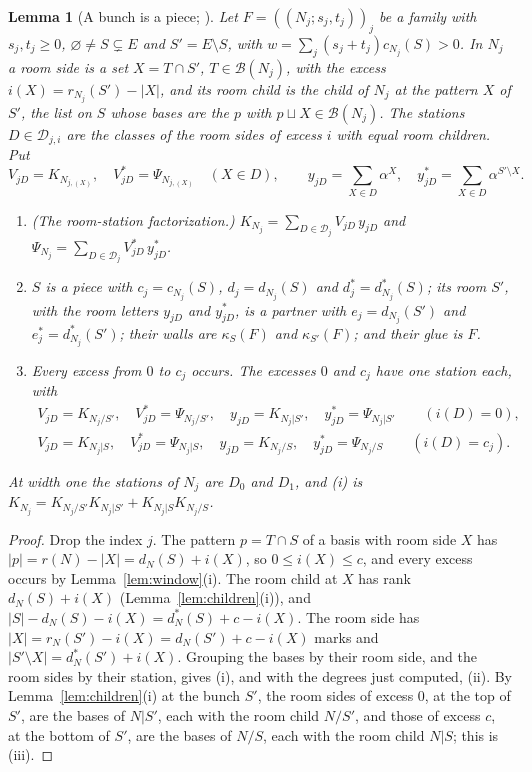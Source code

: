 \documentclass[11pt]{article}
\theoremstyle{plain}
\newtheorem{lemma}[prop]{Lemma}
\theoremstyle{definition}
\theoremstyle{remark}
\newcommand{\cB}{\mathcal B}
\newcommand{\cD}{\mathcal D}
\begin{document}
\begin{lemma}[A bunch is a piece; {\cite[Def.~27.1, p.~224; Props.~27.2, 27.3, pp.~225--226]{F}}]\label{lem:bunchpiece}
Let $F=((N_j;s_j,t_j))_j$ be a family with $s_j,t_j\ge0$, $\varnothing\neq S\subsetneq E$ and $S'=E\setminus S$, with $w=\sum_j(s_j+t_j)c_{N_j}(S)>0$. In $N_j$ a \emph{room side} is a set $X=T\cap S'$, $T\in\cB(N_j)$, with the excess $i(X)=r_{N_j}(S')-|X|$, and its \emph{room child} is the child of $N_j$ at the pattern $X$ of $S'$, the list on $S$ whose bases are the $p$ with $p\sqcup X\in\cB(N_j)$. The \emph{stations} $D\in\cD_{j,i}$ are the classes of the room sides of excess $i$ with equal room children. Put
\[
V_{jD}=K_{N_{j,(X)}},\quad V^\ast_{jD}=\Psi_{N_{j,(X)}}\quad(X\in D),\qquad y_{jD}=\sum_{X\in D}\alpha^X,\quad y^\ast_{jD}=\sum_{X\in D}\alpha^{S'\setminus X}.
\]
\begin{enumerate}[label=(\roman*)]
\item (\emph{The room-station factorization.}) $K_{N_j}=\sum_{D\in\cD_j}V_{jD}\,y_{jD}$ and $\Psi_{N_j}=\sum_{D\in\cD_j}V^\ast_{jD}\,y^\ast_{jD}$.
\item $S$ is a piece with $c_j=c_{N_j}(S)$, $d_j=d_{N_j}(S)$ and $d^\ast_j=d^\ast_{N_j}(S)$; its room $S'$, with the room letters $y_{jD}$ and $y^\ast_{jD}$, is a partner with $e_j=d_{N_j}(S')$ and $e^\ast_j=d^\ast_{N_j}(S')$; their walls are $\kappa_S(F)$ and $\kappa_{S'}(F)$; and their glue is $F$.
\item Every excess from $0$ to $c_j$ occurs. The excesses $0$ and $c_j$ have one station each, with
\begin{gather*}
V_{jD}=K_{N_j/S'},\quad V^\ast_{jD}=\Psi_{N_j/S'},\quad y_{jD}=K_{N_j|S'},\quad y^\ast_{jD}=\Psi_{N_j|S'}\qquad(i(D)=0),\\
V_{jD}=K_{N_j|S},\quad V^\ast_{jD}=\Psi_{N_j|S},\quad y_{jD}=K_{N_j/S},\quad y^\ast_{jD}=\Psi_{N_j/S}\qquad(i(D)=c_j).
\end{gather*}
\end{enumerate}
At width one the stations of $N_j$ are $D_0$ and $D_1$, and (i) is $K_{N_j}=K_{N_j/S'}K_{N_j|S'}+K_{N_j|S}K_{N_j/S}$.
\end{lemma}

\begin{proof}
Drop the index $j$. The pattern $p=T\cap S$ of a basis with room side $X$ has $|p|=r(N)-|X|=d_N(S)+i(X)$, so $0\le i(X)\le c$, and every excess occurs by Lemma~\ref{lem:window}(i). The room child at $X$ has rank $d_N(S)+i(X)$ (Lemma~\ref{lem:children}(i)), and $|S|-d_N(S)-i(X)=d^\ast_N(S)+c-i(X)$. The room side has $|X|=r_N(S')-i(X)=d_N(S')+c-i(X)$ marks and $|S'\setminus X|=d^\ast_N(S')+i(X)$. Grouping the bases by their room side, and the room sides by their station, gives (i), and with the degrees just computed, (ii). By Lemma~\ref{lem:children}(i) at the bunch $S'$, the room sides of excess $0$, at the top of $S'$, are the bases of $N|S'$, each with the room child $N/S'$, and those of excess $c$, at the bottom of $S'$, are the bases of $N/S$, each with the room child $N|S$; this is (iii).
\end{proof}
\end{document}
